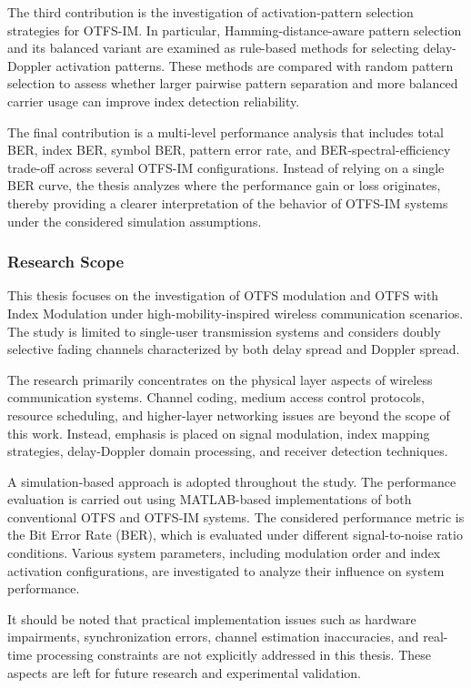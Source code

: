 The third contribution is the investigation of activation-pattern selection strategies for OTFS-IM. In particular, Hamming-distance-aware pattern selection and its balanced variant are examined as rule-based methods for selecting delay-Doppler activation patterns. These methods are compared with random pattern selection to assess whether larger pairwise pattern separation and more balanced carrier usage can improve index detection reliability.

The final contribution is a multi-level performance analysis that includes total BER, index BER, symbol BER, pattern error rate, and BER-spectral-efficiency trade-off across several OTFS-IM configurations. Instead of relying on a single BER curve, the thesis analyzes where the performance gain or loss originates, thereby providing a clearer interpretation of the behavior of OTFS-IM systems under the considered simulation assumptions.

\subsubsection{Research Scope}

This thesis focuses on the investigation of OTFS modulation and OTFS with Index Modulation under high-mobility-inspired wireless communication scenarios. The study is limited to single-user transmission systems and considers doubly selective fading channels characterized by both delay spread and Doppler spread.

The research primarily concentrates on the physical layer aspects of wireless communication systems. Channel coding, medium access control protocols, resource scheduling, and higher-layer networking issues are beyond the scope of this work. Instead, emphasis is placed on signal modulation, index mapping strategies, delay-Doppler domain processing, and receiver detection techniques.

A simulation-based approach is adopted throughout the study. The performance evaluation is carried out using MATLAB-based implementations of both conventional OTFS and OTFS-IM systems. The considered performance metric is the Bit Error Rate (BER), which is evaluated under different signal-to-noise ratio conditions. Various system parameters, including modulation order and index activation configurations, are investigated to analyze their influence on system performance.

It should be noted that practical implementation issues such as hardware impairments, synchronization errors, channel estimation inaccuracies, and real-time processing constraints are not explicitly addressed in this thesis. These aspects are left for future research and experimental validation.

